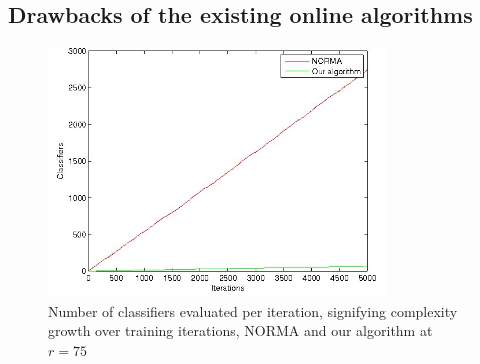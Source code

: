 \subsection{Drawbacks of the existing online algorithms}
\begin{figure}[t]
		\centering
		\includegraphics[width=0.8\textwidth]{NORMAOursGrowth}
		\caption[Number of classifiers evaluated per iteration, NORMA and our algorithm]{Number of classifiers evaluated per iteration, signifying complexity growth over training iterations, NORMA and our algorithm at $r=75$}
		\label{NORMAOurs}
	\end{figure}
